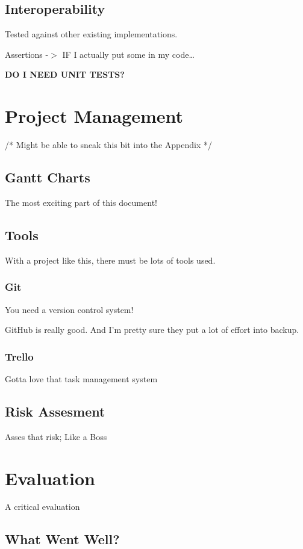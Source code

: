 \documentclass[12pt]{report}
\begin{document}
\section{Interoperability}

Tested against other existing implementations.

Assertions -$>$ IF I actually put some in my code\ldots

\textbf{DO I NEED UNIT TESTS?}

\chapter{Project Management}
/* Might be able to sneak this bit into the Appendix */

\section{Gantt Charts}
The most exciting part of this document!

\section{Tools}
With a project like this, there must be lots of tools used. 

\subsection{Git}
You need a version control system!

GitHub is really good. And I'm pretty sure they put a lot of effort into backup.

\subsection{Trello}
Gotta love that task management system

\section{Risk Assesment}
Asses that risk; Like a Boss

\chapter{Evaluation}
A critical evaluation

\section{What Went Well?}
\end{document}
